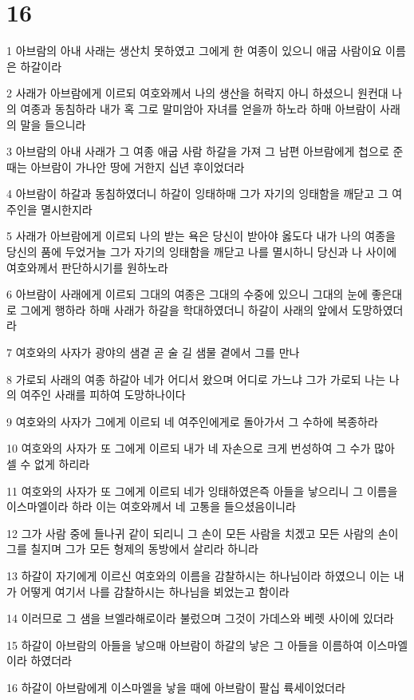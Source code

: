 \chapter{16}

\par 1 아브람의 아내 사래는 생산치 못하였고 그에게 한 여종이 있으니 애굽 사람이요 이름은 하갈이라
\par 2 사래가 아브람에게 이르되 여호와께서 나의 생산을 허락지 아니 하셨으니 원컨대 나의 여종과 동침하라 내가 혹 그로 말미암아 자녀를 얻을까 하노라 하매 아브람이 사래의 말을 들으니라
\par 3 아브람의 아내 사래가 그 여종 애굽 사람 하갈을 가져 그 남편 아브람에게 첩으로 준 때는 아브람이 가나안 땅에 거한지 십년 후이었더라
\par 4 아브람이 하갈과 동침하였더니 하갈이 잉태하매 그가 자기의 잉태함을 깨닫고 그 여주인을 멸시한지라
\par 5 사래가 아브람에게 이르되 나의 받는 욕은 당신이 받아야 옳도다 내가 나의 여종을 당신의 품에 두었거늘 그가 자기의 잉태함을 깨닫고 나를 멸시하니 당신과 나 사이에 여호와께서 판단하시기를 원하노라
\par 6 아브람이 사래에게 이르되 그대의 여종은 그대의 수중에 있으니 그대의 눈에 좋은대로 그에게 행하라 하매 사래가 하갈을 학대하였더니 하갈이 사래의 앞에서 도망하였더라
\par 7 여호와의 사자가 광야의 샘곁 곧 술 길 샘물 곁에서 그를 만나
\par 8 가로되 사래의 여종 하갈아 네가 어디서 왔으며 어디로 가느냐 그가 가로되 나는 나의 여주인 사래를 피하여 도망하나이다
\par 9 여호와의 사자가 그에게 이르되 네 여주인에게로 돌아가서 그 수하에 복종하라
\par 10 여호와의 사자가 또 그에게 이르되 내가 네 자손으로 크게 번성하여 그 수가 많아 셀 수 없게 하리라
\par 11 여호와의 사자가 또 그에게 이르되 네가 잉태하였은즉 아들을 낳으리니 그 이름을 이스마엘이라 하라 이는 여호와께서 네 고통을 들으셨음이니라
\par 12 그가 사람 중에 들나귀 같이 되리니 그 손이 모든 사람을 치겠고 모든 사람의 손이 그를 칠지며 그가 모든 형제의 동방에서 살리라 하니라
\par 13 하갈이 자기에게 이르신 여호와의 이름을 감찰하시는 하나님이라 하였으니 이는 내가 어떻게 여기서 나를 감찰하시는 하나님을 뵈었는고 함이라
\par 14 이러므로 그 샘을 브엘라해로이라 불렀으며 그것이 가데스와 베렛 사이에 있더라
\par 15 하갈이 아브람의 아들을 낳으매 아브람이 하갈의 낳은 그 아들을 이름하여 이스마엘이라 하였더라
\par 16 하갈이 아브람에게 이스마엘을 낳을 때에 아브람이 팔십 륙세이었더라

